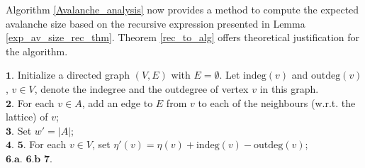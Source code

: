 \documentclass{article}
\begin{document}
Algorithm \ref{Avalanche_analysis} now provides a method to compute the expected avalanche size based on the recursive expression presented in Lemma \ref{exp_av_size_rec_thm}. Theorem \ref{rec_to_alg} offers theoretical justification for the algorithm.





\begin{algorithm}
  \SetAlgoLined
  
  $\mathbf{1}.$ Initialize a directed graph $(V, E)$ with $E = \emptyset$. Let $\text{indeg}(v)$ and $\text{outdeg}(v)$, $v \in V$, denote the indegree and the outdegree of vertex $v$ in this graph. \\
  $\mathbf{2}.$ For each $v \in A$, add an edge to $E$ from $v$ to each of the neighbours (w.r.t. the lattice) of $v$;\\
  $\mathbf{3}.$ Set $w' = |A|$; \\
  $\mathbf{4}.$ 
  $\mathbf{5}.$ For each $v \in V$, set $\eta'(v) = \eta(v) + \text{indeg}(v) - \text{outdeg}(v)$;\\
  $\mathbf{6.a}.$ 
  $\mathbf{6.b}$  
  $\mathbf{7.}$  
  \caption{Analysis of avalanche development through decomposition into waves.}
  \label{Avalanche_analysis}
\end{algorithm}
\end{document}
